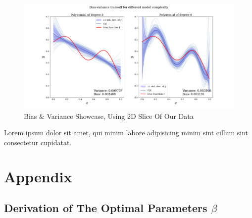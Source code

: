 \documentclass[twoside,11pt]{report}
\begin{document}
\begin{figure}[h]
    \begin{center}
        \includegraphics[width=1.0\textwidth]{../runsAndAdditions/bias-variance2.png}
    \end{center}
    \caption{Bias \& Variance Showcase, Using 2D Slice Of Our Data}\label{fig:bias-variance2}
\end{figure}


Lorem ipsum dolor sit amet, qui minim labore adipisicing minim sint cillum sint consectetur cupidatat.



































%
%
\newpage
\appendix
{}%
\section*{Appendix}
\label{app:appendix}




%
\subsection*{Derivation of The Optimal Parameters $\beta$}
\label{app:OptimalBeta}
\end{document}
